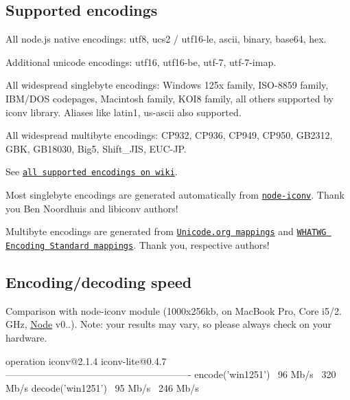 \subsection*{Supported encodings}


\begin{DoxyItemize}
\item All node.\+js native encodings\+: utf8, ucs2 / utf16-\/le, ascii, binary, base64, hex.
\item Additional unicode encodings\+: utf16, utf16-\/be, utf-\/7, utf-\/7-\/imap.
\item All widespread singlebyte encodings\+: Windows 125x family, I\+S\+O-\/8859 family, I\+B\+M/\+D\+OS codepages, Macintosh family, K\+O\+I8 family, all others supported by iconv library. Aliases like \textquotesingle{}latin1\textquotesingle{}, \textquotesingle{}us-\/ascii\textquotesingle{} also supported.
\item All widespread multibyte encodings\+: C\+P932, C\+P936, C\+P949, C\+P950, G\+B2312, G\+BK, G\+B18030, Big5, Shift\+\_\+\+J\+IS, E\+U\+C-\/\+JP.
\end{DoxyItemize}

See \href{https://github.com/ashtuchkin/iconv-lite/wiki/Supported-Encodings}{\tt all supported encodings on wiki}.

Most singlebyte encodings are generated automatically from \href{https://github.com/bnoordhuis/node-iconv}{\tt node-\/iconv}. Thank you Ben Noordhuis and libiconv authors!

Multibyte encodings are generated from \href{http://www.unicode.org/Public/MAPPINGS/}{\tt Unicode.\+org mappings} and \href{http://encoding.spec.whatwg.org/}{\tt W\+H\+A\+T\+WG Encoding Standard mappings}. Thank you, respective authors!

\subsection*{Encoding/decoding speed}

Comparison with node-\/iconv module (1000x256kb, on Mac\+Book Pro, Core i5/2. G\+Hz, \mbox{\hyperlink{classNode}{Node}} v0..). Note\+: your results may vary, so please always check on your hardware. \begin{DoxyVerb}operation             iconv@2.1.4   iconv-lite@0.4.7
----------------------------------------------------------
encode('win1251')     ~96 Mb/s      ~320 Mb/s
decode('win1251')     ~95 Mb/s      ~246 Mb/s
\end{DoxyVerb}



